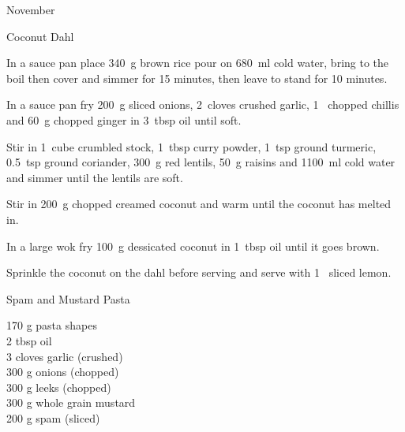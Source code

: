 \begin{menu}{November}
\begin{recipe}{2}{Coconut Dahl}
\begin{ingredients}
		\end{ingredients}
	
	
	
    \begin{instructions}
    \item 
    In a
    sauce pan
    place
    340~g  brown rice
    pour on
    680~ml  cold water,
    bring to the boil then cover and simmer for 15 minutes,
    then leave to stand for 10 minutes.
  \item 
        In a sauce pan  fry
        200~g sliced onions,
        2~cloves crushed garlic,
        1~ chopped chillis
        and
        60~g chopped ginger
        in 
        3~tbsp  oil 
        until soft.
      \item 
        Stir in
        1~cube crumbled stock,
        1~tbsp  curry powder,
        1~tsp  ground turmeric,
        0.5~tsp  ground coriander,
        300~g  red lentils,
        50~g  raisins
        and
        1100~ml  cold water
        and simmer until the lentils are soft.
      \item 
        Stir in 
        200~g chopped creamed coconut
        and warm until the coconut has melted in.
      \item 
        In a large wok fry
        100~g  dessicated coconut
        in
        1~tbsp  oil
        until it goes brown.
      \item 
        Sprinkle the coconut on the dahl
        before serving
        and
        serve with
        1~ sliced lemon.
      
    \end{instructions}
    \end{recipe}%
  
    \begin{recipe}{1}{Spam and Mustard Pasta}%
		\begin{ingredients}
		170 g pasta shapes  \\
	2 tbsp oil  \\
	3 cloves garlic (crushed) \\
	300 g onions (chopped) \\
	300 g leeks (chopped) \\
	300 g whole grain mustard  \\
	200 g spam (sliced) \\
	
		\end{ingredients}
	

\end{recipe}
\end{menu}
